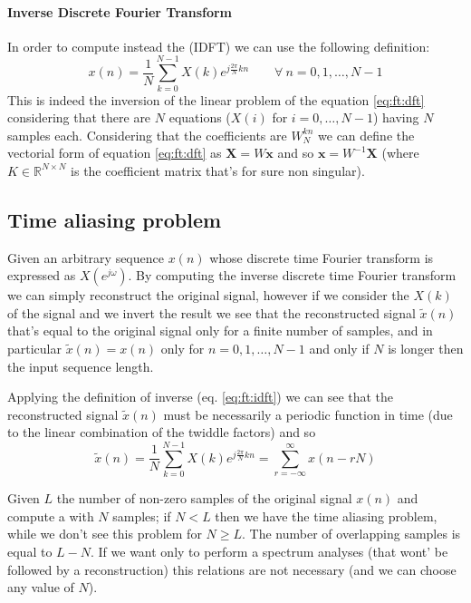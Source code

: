 	\paragraph{Inverse Discrete Fourier Transform} In order to compute instead the  (IDFT) we can use the following definition:
	\begin{equation} \label{eq:ft:idft}
		x(n) = \frac 1 N \sum_{k=0}^{N-1} X(k) e^{j\frac{2\pi}{N} kn} \qquad \forall \ n = 0,1,\dots,N-1
	\end{equation}
	This is indeed the inversion of the linear problem of the equation \ref{eq:ft:dft} considering that there are $N$ equations ($X(i)$ for $i=0,\dots, N-1$) having $N$ samples each. Considering that the coefficients are $W_N^{kn}$ we can define the vectorial form of equation \ref{eq:ft:dft} as $\boldsymbol X = W \boldsymbol x$ and so $\boldsymbol x = W^{-1} \boldsymbol X$ (where $K \in \mathds R^{N\times N}$ is the coefficient matrix that's for sure non singular).
	
\subsection{Time aliasing problem}
	Given an arbitrary sequence $x(n)$ whose discrete time Fourier transform is expressed as $X(e^{j\omega})$. By computing the inverse discrete time Fourier transform we can simply reconstruct the original signal, however if we consider the \dft  $X(k)$ of the signal and we invert the result we see that the reconstructed signal $\tilde x(n)$ that's equal to the original signal only for a finite number of samples, and in particular $\tilde x(n) = x(n)$ only for $n=0,1,\dots, N-1$ and only if $N$ is longer then the input sequence length.
	
	Applying the definition of inverse \dft (eq. \ref{eq:ft:idft}) we can see that the reconstructed signal $\tilde x(n)$ must be necessarily a periodic function in time (due  to the linear combination of the twiddle factors) and so
	\[ \tilde x(n) = \frac 1 N \sum_{k=0}^{N-1} X(k) e^{j\frac{2\pi}{N} kn} = \sum_{r=-\infty}^\infty x(n-rN) \]
	
	Given $L$ the number of non-zero samples of the original signal $x(n)$ and compute a \dft with $N$ samples; if $N<L$ then we have the time aliasing problem, while we don't see this problem for $N\geq L$. The number of overlapping samples is equal to $L-N$. If we want only to perform a spectrum analyses (that wont' be followed by a reconstruction) this relations are not necessary (and we can choose any value of $N$).
	
